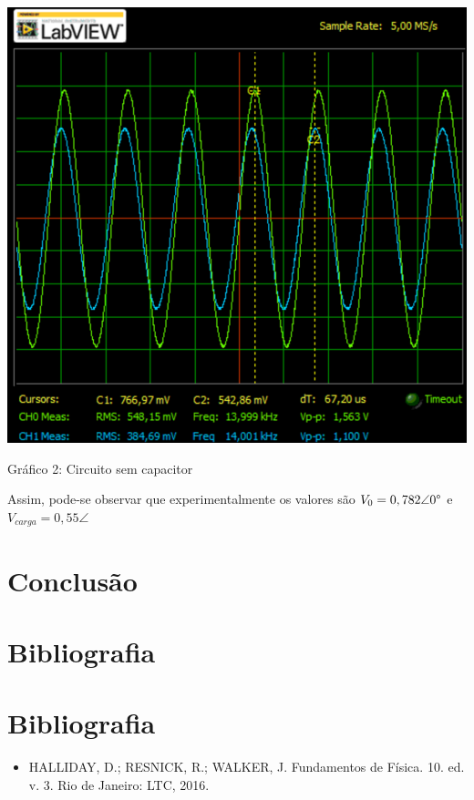 \documentclass[a4 paper]{article}
\begin{document}
\begin{table}[h]
\centering
\includegraphics[scale=0.3575]{rgadicoas/rgadicoa1}
\end{table}

\begin{center}
Gráfico 2: Circuito sem capacitor
\end{center}

Assim, pode-se observar que experimentalmente os valores são $V_0=0,782\angle0\text{\textdegree}$ e $V_{carga}=0,55\angle$







\section{Conclusão}

\section{Bibliografia}

\section{Bibliografia}

\begin{itemize}
\item HALLIDAY, D.; RESNICK, R.; WALKER, J. Fundamentos de Física. 10. ed. v. 3. Rio de Janeiro: LTC, 2016.
\end{itemize}
\end{document}
